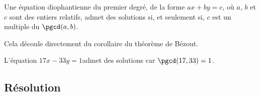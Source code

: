 \begin{propriete}
  Une équation diophantienne du premier degré, de la forme $ax+by=c$,
  où $a$, $b$ et $c$ sont des entiers relatifs, admet des solutions
  si, et seulement si, $c$ est un multiple du $\pgcd(a,b)$.
\end{propriete}

\begin{preuve}
  Cela découle directement du corollaire du théorème de Bézout.
\end{preuve}

\begin{exemple*1}
  L'équation \enskip $17x-33y=1$\enskip admet des solutions car
  $\pgcd(17,33)=1$.
\end{exemple*1}

\subsection{Résolution}

